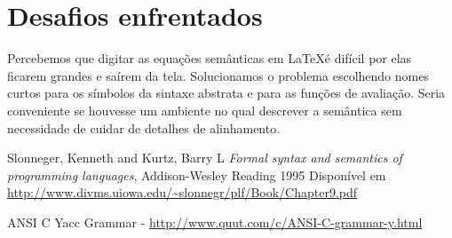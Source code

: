\documentclass[12pt]{article}
\begin{document}
\section{Desafios enfrentados}
Percebemos que digitar as equações semânticas em \LaTeX é difícil por elas ficarem grandes e saírem da tela. Solucionamos o problema escolhendo nomes curtos para os símbolos da sintaxe abstrata e para as funções de avaliação. Seria conveniente se houvesse um ambiente no qual descrever a semântica sem necessidade de cuidar de detalhes de alinhamento. 

\begin{thebibliography}{9}
  Slonneger, Kenneth and Kurtz, Barry L
  \textit{Formal syntax and semantics of programming languages},
  Addison-Wesley Reading
  1995
  Disponível em \url{http://www.divms.uiowa.edu/~slonnegr/plf/Book/Chapter9.pdf}

\item ANSI C Yacc Grammar - \url{http://www.quut.com/c/ANSI-C-grammar-y.html}
\end{thebibliography}
	
\end{document}
